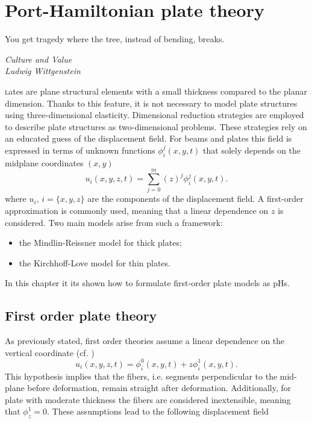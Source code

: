 \chapter{Port-Hamiltonian plate theory}

\epigraph{You get tragedy where the tree, instead of bending, breaks.}{\textit{Culture and Value\\
Ludwig Wittgenstein}}
\minitoc

\lettrine{\color{theme}{P}}lates are plane structural elements with a small thickness compared to the planar dimension. Thanks to this feature, it is not necessary to model plate structures using three-dimensional elasticity. Dimensional reduction strategies are employed to describe plate structures as two-dimensional problems. These strategies rely on an educated guess of the displacement field. For beams and plates this field is expressed in terms of unknown functions $\phi_i^j(x,y,t)$ that solely depends on the midplane coordinates $(x,y)$
\begin{equation*}
u_i(x,y,z,t) = \sum_{j=0}^m (z)^j \phi_i^j(x,y,t).
\end{equation*}
where $u_{i}, \, i = \{x, y, z\}$ are the components of the displacement field. A first-order approximation is commonly used, meaning that a linear dependence on $z$ is considered. Two main models arise from such a framework: 
\begin{itemize}
	\item the Mindlin-Reissner model for thick plates;
	\item the Kirchhoff-Love model for thin plates.
\end{itemize}

In this chapter it its shown how to formulate first-order plate models as pHs. 

\section{First order plate theory}
As previously stated, first order theories assume a linear dependence on the vertical coordinate (cf. \cite{reddy2006theory})
\begin{equation*}
u_i(x,y,z,t) = \phi_i^0(x,y,t) + z \phi_i^1(x,y,t).
\end{equation*}
This hypothesis implies that the fibers, i.e. segments perpendicular to the mid-plane before deformation, remain straight after deformation. Additionally, for plate with moderate thickness the fibers are considered inextensible, meaning that $\phi_z^1 = 0$. These assumptions lead to the following displacement field

